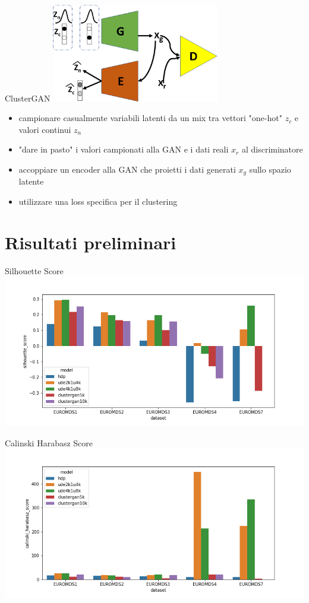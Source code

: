 \documentclass{beamer}
\begin{document}
\begin{frame}{ClusterGAN}
	\centering
	\includegraphics[width=0.55\textwidth, keepaspectratio]{./images/ClusterGAN_model.png}
	\begin{itemize}
		\item campionare casualmente variabili latenti da un mix tra vettori "one-hot" $z_c$ e valori continui $z_n$
		\item "dare in pasto" i valori campionati alla GAN e i dati reali $x_r$ al discriminatore
		\item accoppiare un encoder alla GAN che proietti i dati generati $x_g$ sullo spazio latente
		\item utilizzare una loss specifica per il clustering
	\end{itemize}
\end{frame}

\section{Risultati preliminari}

\begin{frame}{Silhouette Score}
	\centering
	\includegraphics[width=\textwidth, keepaspectratio]{./images/silh_score.png}
\end{frame}

\begin{frame}{Calinski Harabasz Score}
	\centering
	\includegraphics[width=\textwidth, keepaspectratio]{./images/cal_har_score.png}
\end{frame}
\end{document}
